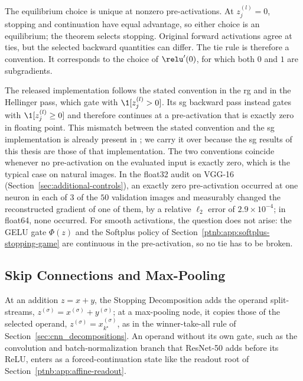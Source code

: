 \begin{remark}\label{ptnb:rem:adf-spne-uniqueness}
The equilibrium choice is unique at nonzero pre-activations. At $z_j^{(l)}=0$, stopping and
continuation have equal advantage, so either choice is an equilibrium; the theorem selects stopping.
Original forward activations agree at ties, but the selected backward quantities can differ.
The tie rule is therefore a convention. It corresponds to the choice of $\relu'(0)$, for which both $0$ and $1$ are subgradients.

The released implementation follows the stated convention in the \ac{rg} and in the Hellinger pass, which gate with
$\1[z_j^{(l)}>0]$. Its \ac{sg} backward pass instead gates with $\1[z_j^{(l)}\ge0]$ and therefore continues at a
pre-activation that is exactly zero in floating point. This mismatch between the stated convention and the \ac{sg} implementation is already present in \textcite{playingBackward2026}; we carry it over because the \ac{sg} results of this thesis are those of that implementation. The two conventions coincide whenever no pre-activation on the
evaluated input is exactly zero, which is the typical case on natural images. In the float32 audit on VGG-16 (Section~\ref{sec:additional-controls}), an exactly zero pre-activation occurred at one neuron in each of $3$ of the $50$ validation images and measurably changed the reconstructed gradient of one of them, by a relative $\ell_2$ error of $2.9\times10^{-4}$; in float64, none occurred. For smooth activations, the question does not arise: the GELU gate $\Phi(z)$ and the Softplus policy of Section~\ref{ptnb:app:softplus-stopping-game} are continuous in the pre-activation, so no tie has to be broken.
\end{remark}

\subsection{Skip Connections and Max-Pooling}\label{ptnb:app:skip-connections}

At an addition $z=x+y$, the Stopping Decomposition adds the operand split-streams, $z^{(\sigma)}=x^{(\sigma)}+y^{(\sigma)}$; at a max-pooling node, it copies those of the selected operand, $z^{(\sigma)}=x_{k^\star}^{(\sigma)}$, as in the winner-take-all rule of Section~\ref{sec:cnn_decompositions}. An operand without its own gate, such as the convolution and batch-normalization branch that ResNet-50 adds before its ReLU, enters as a forced-continuation state like the readout root of Section~\ref{ptnb:app:affine-readout}.

